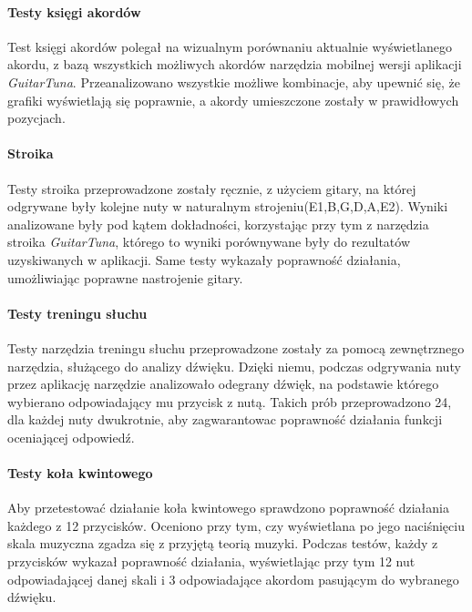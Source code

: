 \paragraph{Testy księgi akordów}

Test księgi akordów polegał na wizualnym porównaniu aktualnie wyświetlanego akordu, z bazą wszystkich możliwych akordów narzędzia mobilnej wersji aplikacji \emph{GuitarTuna}.  Przeanalizowano wszystkie możliwe kombinacje, aby upewnić się, że grafiki wyświetlają się poprawnie, a akordy umieszczone zostały w prawidłowych pozycjach.

\paragraph{Stroika}

Testy stroika przeprowadzone zostały ręcznie, z użyciem gitary, na której odgrywane były kolejne nuty w naturalnym strojeniu(E1,B,G,D,A,E2). Wyniki analizowane były pod kątem dokładności, korzystając przy tym z narzędzia stroika \emph{GuitarTuna}, którego to wyniki porównywane były do rezultatów uzyskiwanych w aplikacji. Same testy wykazały poprawność działania, umożliwiając poprawne nastrojenie gitary. 

\paragraph{Testy treningu słuchu}

Testy narzędzia treningu słuchu przeprowadzone zostały za pomocą zewnętrznego narzędzia, służącego do analizy dźwięku. Dzięki niemu, podczas odgrywania nuty przez aplikację narzędzie analizowało odegrany dźwięk, na podstawie którego wybierano odpowiadający mu przycisk z nutą. Takich prób przeprowadzono 24, dla każdej nuty dwukrotnie, aby zagwarantowac poprawność działania funkcji oceniającej odpowiedź.

\paragraph{Testy koła kwintowego}

Aby przetestować działanie koła kwintowego sprawdzono poprawność działania każdego z 12 przycisków. Oceniono przy tym, czy wyświetlana po jego naciśnięciu skala muzyczna zgadza się z przyjętą teorią muzyki. Podczas testów, każdy z przycisków wykazał poprawność działania, wyświetlając przy tym 12 nut odpowiadającej danej skali i 3 odpowiadające akordom pasującym do wybranego dźwięku. 